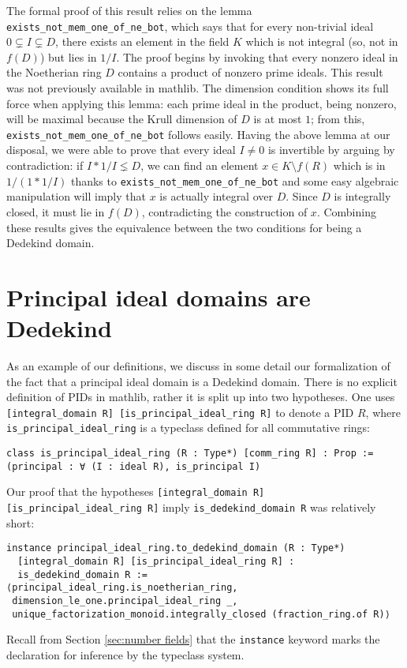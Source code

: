 \documentclass[a4paper,USenglish,cleveref, autoref, thm-restate]{lipics-v2021}
\newcommand{\lean}[1]{\texttt{#1}\xspace}
\newcommand{\mathlib}{\textsf{mathlib}\xspace}
\begin{document}
The formal proof of this result relies on the lemma \lean{exists\_not\_mem\_one\_of\_ne\_bot}, which says that for every non-trivial ideal $0\subsetneq I\subsetneq D$, there exists an element in the field $K$ which is not integral (so, not in $f(D)$) but lies in $1/I$. The proof begins by invoking that every nonzero ideal in the Noetherian ring $D$ contains a product of nonzero prime ideals. This result was not previously available in \mathlib.
The dimension condition shows its full force when applying this lemma:
each prime ideal in the product, being nonzero, will be maximal because the Krull dimension of $D$ is at most $1$; from this, \lean{exists\_not\_mem\_one\_of\_ne\_bot} follows easily. Having the above lemma at our disposal,
we were able to prove that every ideal $I\ne 0$ is invertible by arguing by contradiction: if $I\ast 1/I\lneq D$, we can find an element $x\in K\setminus f(R)$ which is in $1/(1\ast 1/I)$ thanks to \lean{exists\_not\_mem\_one\_of\_ne\_bot} and some easy algebraic manipulation will imply that $x$ is actually integral over $D$. Since $D$ is integrally closed, it must lie in $f(D)$, contradicting the construction of $x$. Combining these results gives the equivalence between the two conditions for being a Dedekind domain.

\section{Principal ideal domains are Dedekind}

As an example of our definitions, we discuss in some detail our formalization of the fact that a principal ideal domain is a Dedekind domain. There is no explicit definition of PIDs in \mathlib, rather it is split up into two hypotheses.
One uses \lean{[integral\_domain R] [is\_principal\_ideal\_ring R]} to denote a PID $R$,
where \lean{is\_principal\_ideal\_ring} is a typeclass defined for all commutative rings:
\begin{lstlisting}
class is_principal_ideal_ring (R : Type*) [comm_ring R] : Prop :=
(principal : ∀ (I : ideal R), is_principal I)
\end{lstlisting}

Our proof that the hypotheses \lean{[integral\_domain R] [is\_principal\_ideal\_ring R]} imply \lean{is\_dedekind\_domain R} was relatively short:
\begin{lstlisting}
instance principal_ideal_ring.to_dedekind_domain (R : Type*)
  [integral_domain R] [is_principal_ideal_ring R] :
  is_dedekind_domain R :=
⟨principal_ideal_ring.is_noetherian_ring,
 dimension_le_one.principal_ideal_ring _,
 unique_factorization_monoid.integrally_closed (fraction_ring.of R)⟩
\end{lstlisting}
Recall from Section \ref{sec:number fields} that the \lean{instance} keyword marks the declaration for inference by the typeclass system.
\end{document}
